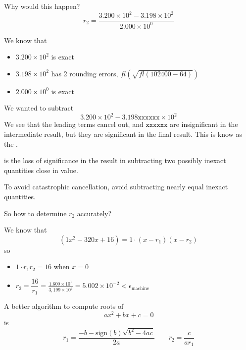 Why would this happen? \[
    r_2 = \frac{3.200 \times 10^2 - 3.198 \times 10^2}{2.000 \times 10^0}
\]

We know that
\begin{itemize}
    \item \( 3.200 \times 10^2 \) is exact
    \item \( 3.198 \times 10^2 \) has 2 rounding errors, \( fl(\sqrt{fl(102400 - 64)}) \)
    \item \( 2.000 \times 10^0 \) is exact
\end{itemize}

We wanted to subtract \[
    3.200 \times 10^2 - 3.198\texttt{xxxxxx} \times 10^2
\] We see that the leading terms cancel out, and \( \texttt{xxxxxx} \) are insignificant in the intermediate result, but they are significant in the final result. This is know as the .

\begin{definition}
     is the loss of significance in the result in subtracting two possibly inexact quantities close in value.
\end{definition}

\begin{remark}
    To avoid catastrophic cancellation, avoid subtracting nearly equal inexact quantities.
\end{remark}

\begin{example}[Cont.]
    So how to determine \( r_2 \) accurately?

    We know that \[
        ( 1x^2 - 320x + 16 ) = 1 \cdot ( x - r_1 ) ( x - r_2 )
    \] so
    \begin{itemize}
        \item \( 1 \cdot r_1 r_2 = 16 \) when \( x = 0 \)
        \item \( r_2 = \dfrac{16}{r_1} = \frac{1.600 \times 10^1}{3,199 \times 10^2} = 5.002 \times 10^{-2} < \epsilon_{\text{machine}} \)
    \end{itemize}
\end{example}

\begin{remark}
    A better algorithm to compute roots of \[
        ax^2 + bx + c = 0
    \] is \[
        r_1 = \frac{-b - \text{sign}(b) \sqrt{b^2 - 4ac}}{2a} \qquad r_2 = \frac{c}{ar_1}
    \]
\end{remark}

